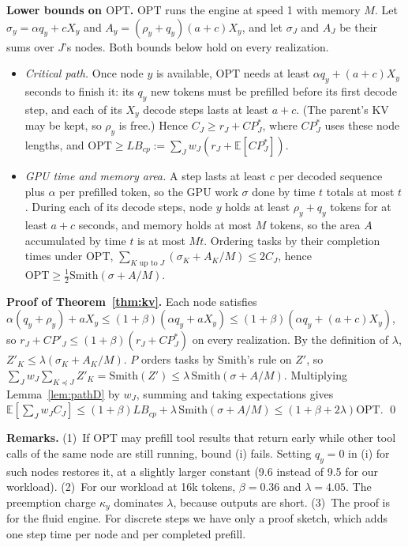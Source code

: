 \documentclass{article}
\newcommand{\OPT}{\mathrm{OPT}}
\begin{document}
\textbf{Lower bounds on $\OPT$.} $\OPT$ runs the engine at speed 1 with memory $M$. Let
$\sigma_y = \alpha q_y + cX_y$ and $A_y = (\rho_y + q_y)(a+c)X_y$, and let $\sigma_J$ and $A_J$ be their sums over
$J$'s nodes. Both bounds below hold on every realization.
\begin{itemize}
\item[(i)] \emph{Critical path.} Once node $y$ is available, $\OPT$ needs at least $\alpha q_y + (a+c)X_y$ seconds to
finish it: its $q_y$ new tokens must be prefilled before its first decode step, and each of its $X_y$ decode
steps lasts at least $a + c$. (The parent's KV may be kept, so $\rho_y$ is free.) Hence $C_J \ge r_J + CP^*_J$,
where $CP^*_J$ uses these node lengths, and $\OPT \ge LB_{cp} := \sum_J w_J(r_J + \mathbb{E}[CP^*_J])$.
\item[(ii)] \emph{GPU time and memory area.} A step lasts at least $c$ per decoded sequence plus $\alpha$ per
prefilled token, so the GPU work $\sigma$ done by time $t$ totals at most $t$. During each of its decode steps,
node $y$ holds at least $\rho_y + q_y$ tokens for at least $a + c$ seconds, and memory holds at most $M$ tokens, so
the area $A$ accumulated by time $t$ is at most $Mt$. Ordering tasks by their completion times under $\OPT$,
$\sum_{K \text{ up to } J}(\sigma_K + A_K/M) \le 2C_J$, hence $\OPT \ge \frac{1}{2}\mathrm{Smith}(\sigma + A/M)$.
\end{itemize}

\textbf{Proof of Theorem~\ref{thm:kv}.} Each node satisfies
$\alpha(q_y + \rho_y) + aX_y \le (1+\beta)(\alpha q_y + aX_y) \le (1+\beta)(\alpha q_y + (a+c)X_y)$, so
$r_J + CP'_J \le (1+\beta)(r_J + CP^*_J)$ on every realization. By the definition of $\lambda$,
$Z'_K \le \lambda(\sigma_K + A_K/M)$. $P$ orders tasks by Smith's rule on $Z'$, so
$\sum_J w_J \sum_{K \preceq J} Z'_K = \mathrm{Smith}(Z') \le \lambda\,\mathrm{Smith}(\sigma + A/M)$. Multiplying
Lemma~\ref{lem:pathD} by $w_J$, summing and taking expectations gives
$\mathbb{E}[\sum_J w_J C_J] \le (1+\beta)LB_{cp} + \lambda\,\mathrm{Smith}(\sigma + A/M) \le (1 + \beta + 2\lambda)\OPT$.
\qed

\textbf{Remarks.} (1)~If $\OPT$ may prefill tool results that return early while other tool calls of the same node
are still running, bound (i) fails. Setting $q_y = 0$ in (i) for such nodes restores it, at a slightly larger
constant (9.6 instead of 9.5 for our workload). (2)~For our workload at 16k tokens, $\beta = 0.36$ and
$\lambda = 4.05$. The preemption charge $\kappa_y$ dominates $\lambda$, because outputs are short. (3)~The proof is
for the fluid engine. For discrete steps we have only a proof sketch, which adds one step time per node and per
completed prefill.
\end{document}
